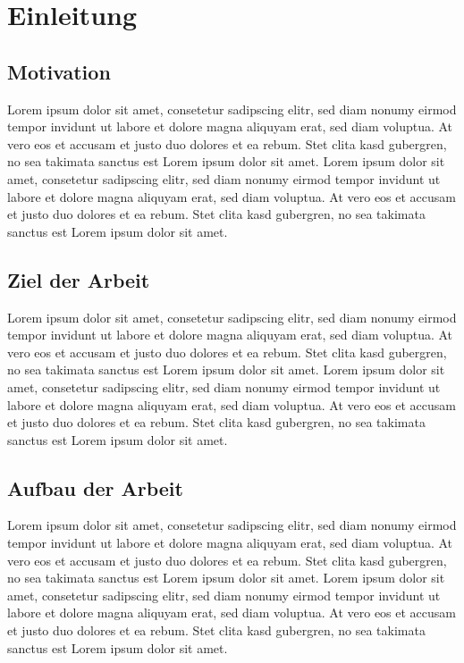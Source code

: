 \chapter{Einleitung}
\label{cha:Einleitung}

\section{Motivation}
\label{sec:Einl:Motivation}

Lorem ipsum dolor sit amet, consetetur sadipscing elitr, sed diam nonumy eirmod tempor invidunt ut labore et dolore magna aliquyam erat, sed diam voluptua. At vero eos et accusam et justo duo dolores et ea rebum. Stet clita kasd gubergren, no sea takimata sanctus est Lorem ipsum dolor sit amet. Lorem ipsum dolor sit amet, consetetur sadipscing elitr, sed diam nonumy eirmod tempor invidunt ut labore et dolore magna aliquyam erat, sed diam voluptua. At vero eos et accusam et justo duo dolores et ea rebum. Stet clita kasd gubergren, no sea takimata sanctus est Lorem ipsum dolor sit amet.

\section{Ziel der Arbeit}
\label{sec:Einl:Ziel_der_Arbeit}

Lorem ipsum dolor sit amet, consetetur sadipscing elitr, sed diam nonumy eirmod tempor invidunt ut labore et dolore magna aliquyam erat, sed diam voluptua. At vero eos et accusam et justo duo dolores et ea rebum. Stet clita kasd gubergren, no sea takimata sanctus est Lorem ipsum dolor sit amet. Lorem ipsum dolor sit amet, consetetur sadipscing elitr, sed diam nonumy eirmod tempor invidunt ut labore et dolore magna aliquyam erat, sed diam voluptua. At vero eos et accusam et justo duo dolores et ea rebum. Stet clita kasd gubergren, no sea takimata sanctus est Lorem ipsum dolor sit amet.

\section{Aufbau der Arbeit}
\label{sec:Einleitung:Aufbau_der_Arbeit}

Lorem ipsum dolor sit amet, consetetur sadipscing elitr, sed diam nonumy eirmod tempor invidunt ut labore et dolore magna aliquyam erat, sed diam voluptua. At vero eos et accusam et justo duo dolores et ea rebum. Stet clita kasd gubergren, no sea takimata sanctus est Lorem ipsum dolor sit amet. Lorem ipsum dolor sit amet, consetetur sadipscing elitr, sed diam nonumy eirmod tempor invidunt ut labore et dolore magna aliquyam erat, sed diam voluptua. At vero eos et accusam et justo duo dolores et ea rebum. Stet clita kasd gubergren, no sea takimata sanctus est Lorem ipsum dolor sit amet.

